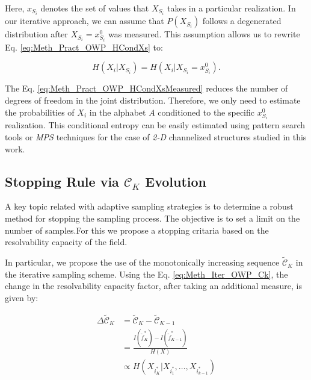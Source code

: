 Here, $x_{S_i}$ denotes the set of values that $X_{S_i}$ takes in a particular realization. %
In our iterative approach, we can assume that $P(X_{S_i})$ follows a degenerated distribution after $X_{S_i} = x^{0}_{S_i}$ was measured. This assumption allows us to rewrite Eq. \eqref{eq:Meth_Pract_OWP_HCondXs} to:

\begin{equation}\label{eq:Meth_Pract_OWP_HCondXsMeasured}
H(X_{i}|X_{S_i}) =  H(X_{i} | X_{S_i} = x^{0}_{S_i}) .
\end{equation}

The Eq. \eqref{eq:Meth_Pract_OWP_HCondXsMeasured} reduces the number of degrees of freedom in the joint distribution. Therefore, we only need to estimate the probabilities of $X_{i}$ in the alphabet $A$ conditioned to the specific $x^{0}_{S_i}$ realization. This conditional entropy can be easily estimated using pattern search tools or \emph{MPS} techniques for the case of \emph{2-D} channelized structures studied in this work.





















\subsection{Stopping Rule via $\mathcal{C}_{K}$ Evolution}
\label{sec_Meth_StopRules}

A key topic related with adaptive sampling strategies is to determine a robust method for stopping the sampling process. The objective is to set a limit on the number of samples.For this we propose a stopping critaria based on the resolvability capacity of the field. 

In particular, we propose the use of the monotonically increasing sequence $\mathcal{\tilde{C}}_{K}$ in the iterative sampling scheme. Using the Eq. \eqref{eq:Meth_Iter_OWP_Ck}, the change in the resolvability capacity factor, after taking an additional measure, is given by:

\begin{align}\label{eq:StopRule_Iter_DeltaCk}
	\Delta \mathcal{\tilde{C}}_{K} & = \mathcal{\tilde{C}}_{K} - \mathcal{\tilde{C}}_{K-1} \\
																 & = \frac{I(\tilde{f}^{*}_{K})- I(\tilde{f}^{*}_{K-1})}{H(X)} \nonumber \\																 & \propto H(X_{ i^{*}_{K} }|X_{ i^{*}_{1} },\ldots,X_{ i^{*}_{k-1} }) \nonumber
\end{align}


